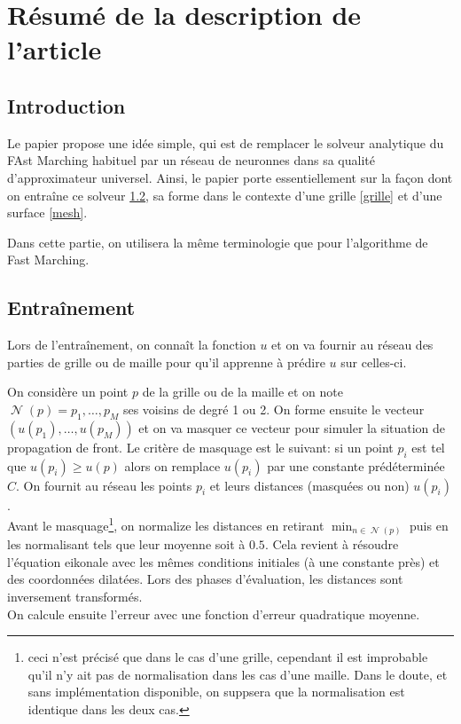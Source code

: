 \documentclass[11pt]{article} %
\DeclareMathOperator\Nn{\mathcal{N}}
\begin{document}
\section{Résumé de la description de l'article}

\subsection{Introduction}
Le papier propose une idée simple, qui est de remplacer le solveur analytique du FAst Marching habituel par un réseau de neuronnes dans sa qualité d'approximateur universel. Ainsi, le papier porte essentiellement sur la façon dont on entraîne ce solveur \ref{training}, sa forme dans le contexte d'une grille \ref{grille} et d'une surface \ref{mesh}.	

Dans cette partie, on utilisera la même terminologie que pour l'algorithme de Fast Marching.

\subsection{Entraînement}\label{training}
Lors de l'entraînement, on connaît la fonction $u$ et on va fournir au réseau des parties de grille ou de maille pour qu'il apprenne à prédire $u$ sur celles-ci. 

On considère un point $p$ de la grille ou de la maille et on note $\Nn(p) = {p_1, \dots, p_M}$ ses voisins de degré 1 ou 2. On forme ensuite le vecteur $(u(p_1), \dots, u(p_M))$ et on va masquer ce vecteur pour simuler la situation de propagation de front. Le critère de masquage est le suivant: si un point $p_i$ est tel que $u(p_i) \geq u(p)$ alors on remplace $u(p_i)$ par une constante prédéterminée $C$. On fournit au réseau les points $p_i$ et leurs distances (masquées ou non) $u(p_i)$.\\
Avant le masquage\footnote{ceci n'est précisé que dans le cas d'une grille, cependant il est improbable qu'il n'y ait pas de normalisation dans les cas d'une maille. Dans le doute, et sans implémentation disponible, on suppsera que la normalisation est identique dans les deux cas.}, on normalize les distances en retirant $\min_{n \in \Nn(p)}$ puis en les normalisant tels que leur moyenne soit à $0.5$. Cela revient à résoudre l'équation eikonale avec les mêmes conditions initiales (à une constante près) et des coordonnées dilatées. Lors des phases d'évaluation, les distances sont inversement transformés.\\
On calcule ensuite l'erreur avec une fonction d'erreur quadratique moyenne.
\end{document}

